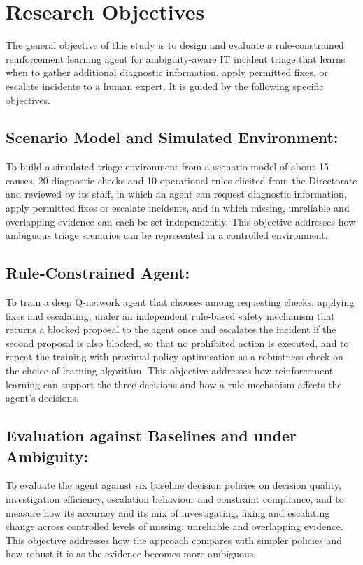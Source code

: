 \section{Research Objectives}

The general objective of this study is to design and evaluate a rule-constrained reinforcement learning agent for ambiguity-aware IT incident triage that learns when to gather additional diagnostic information, apply permitted fixes, or escalate incidents to a human expert. It is guided by the following specific objectives.

\subsection{Scenario Model and Simulated Environment:}

To build a simulated triage environment from a scenario model of about 15 causes, 20 diagnostic checks and 10 operational rules elicited from the Directorate and reviewed by its staff, in which an agent can request diagnostic information, apply permitted fixes or escalate incidents, and in which missing, unreliable and overlapping evidence can each be set independently. This objective addresses how ambiguous triage scenarios can be represented in a controlled environment.

\subsection{Rule-Constrained Agent:}

To train a deep Q-network agent that chooses among requesting checks, applying fixes and escalating, under an independent rule-based safety mechanism that returns a blocked proposal to the agent once and escalates the incident if the second proposal is also blocked, so that no prohibited action is executed, and to repeat the training with proximal policy optimisation as a robustness check on the choice of learning algorithm. This objective addresses how reinforcement learning can support the three decisions and how a rule mechanism affects the agent's decisions.

\subsection{Evaluation against Baselines and under Ambiguity:}

To evaluate the agent against six baseline decision policies on decision quality, investigation efficiency, escalation behaviour and constraint compliance, and to measure how its accuracy and its mix of investigating, fixing and escalating change across controlled levels of missing, unreliable and overlapping evidence. This objective addresses how the approach compares with simpler policies and how robust it is as the evidence becomes more ambiguous.

